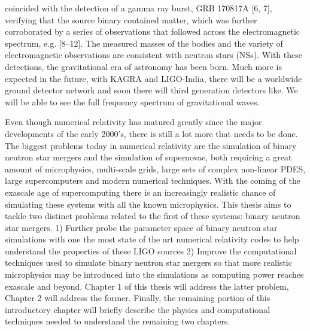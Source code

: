 coincided with the detection of a gamma ray burst, GRB 170817A [6, 7], verifying that the source binary contained matter, which was further corroborated by a series of observations that followed across the electromagnetic spectrum, e.g. [8–12]. The measured masses of the bodies and the variety of electromagnetic observations are consistent with neutron stars (NSs). With these detections, the gravitational era of astronomy has been born. Much more is expected in the future, with KAGRA and LIGO-India, there will be a worldwide ground detector network and soon there will third generation detectors like. We will be able to see the full frequency spectrum of gravitational waves.

Even though numerical relativity has matured greatly since the major developments of the early 2000's, there is still a lot more that needs to be done. The biggest problems today in numerical relativity are the simulation of binary neutron star mergers and the simulation of supernovae, both requiring a great amount of microphysics, multi-scale grids, large sets of complex non-linear PDES, large supercomputers and modern numerical techniques. With the coming of the exascale age of supercomputing there is an increasingly realistic chance of simulating these systems with all the known microphysics. This thesis aims to tackle two distinct problems related to the first of these systems: binary neutron star mergers. 1) Further probe the parameter space of binary neutron star simulations with one the most state of the art numerical relativity codes to help understand the properties of these LIGO sources 2) Improve the computational techniques used to simulate binary neutron star mergers so that more realistic microphysics may be introduced into the simulations as computing power reaches exascale and beyond. Chapter 1 of this thesis will address the latter problem, Chapter 2 will address the former. Finally, the remaining portion of this introductory chapter will briefly describe the physics and computational techniques needed to understand the remaining two chapters.

